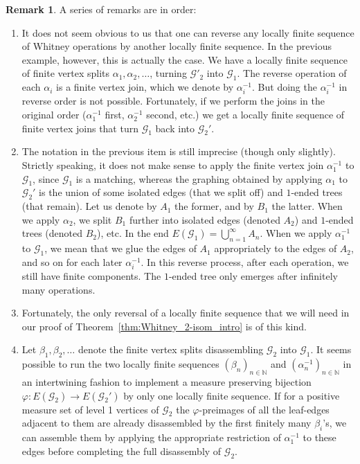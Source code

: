 \documentclass{article}
\theoremstyle{plain}
\theoremstyle{definition}
\newtheorem{rem}[thm]{Remark}
\newcommand{\N}{\mathbb{N}}
\newcommand{\cG}{\mathcal{G}}
\begin{document}
\begin{rem}
    A series of remarks are in order:
\begin{enumerate}
    \item It does not seem obvious to us that one can reverse any locally finite sequence of Whitney operations by another locally finite sequence. In the previous example, however, this is actually the case. We have a locally finite sequence of finite vertex splits $\alpha_1, \alpha_2, \ldots$, turning $\cG'_2$ into $\cG_1$. The reverse operation of each $\alpha_i$ is a finite vertex join, which we denote by $\alpha_i^{-1}$. But doing the $\alpha_i^{-1}$ in reverse order is not possible. Fortunately, if we perform the joins in the original order ($\alpha_1^{-1}$ first, $\alpha^{-1}_2$ second, etc.) we get a locally finite sequence of finite vertex joins that turn $\cG_1$ back into $\cG_2'$.
    
    \item The notation in the previous item is still imprecise (though only slightly). Strictly speaking, it does not make sense to apply the finite vertex join $\alpha^{-1}_1$ to $\cG_1$, since $\cG_1$ is a matching, whereas the graphing obtained by applying $\alpha_1$ to $\cG_2'$ is the union of some isolated edges (that we split off) and $1$-ended trees (that remain). Let us denote by $A_1$ the former, and by $B_1$ the latter. When we apply $\alpha_2$, we split $B_1$ further into isolated edges (denoted $A_2$) and $1$-ended trees (denoted $B_2$), etc. In the end $E(\cG_1) = \bigcup_{n=1}^{\infty} A_n$. When we apply  $\alpha_1^{-1}$ to $\cG_1$, we mean that we glue the edges of $A_1$ appropriately to the edges of $A_2$, and so on for each later $\alpha_i^{-1}$. In this reverse process, after each operation, we still have finite components. The $1$-ended tree only emerges after infinitely many operations. 
    
    \item Fortunately, the only reversal of a locally finite sequence that we will need in our proof of Theorem~\ref{thm:Whitney_2-isom_intro} is of this kind.

    \item Let $\beta_1, \beta_2, \dots$ denote the finite vertex splits disassembling $\cG_2$ into $\cG_1$. It seems possible to run the two locally finite sequences $(\beta_n)_{n\in \N}$ and $(\alpha_n^{-1})_{n\in \N}$ in an intertwining fashion to implement a measure preserving bijection $\varphi: E(\cG_2) \to E(\cG_2')$ by only one locally finite sequence. If for a positive measure set of level 1 vertices of $\cG_2$ the $\varphi$-preimages of all the leaf-edges adjacent to them are already disassembled by the first finitely many $\beta_i$'s, we can assemble them by applying the appropriate restriction of $\alpha_1^{-1}$ to these edges before completing the full disassembly of $\cG_2$.
    

\end{enumerate}
\end{rem}
\end{document}
